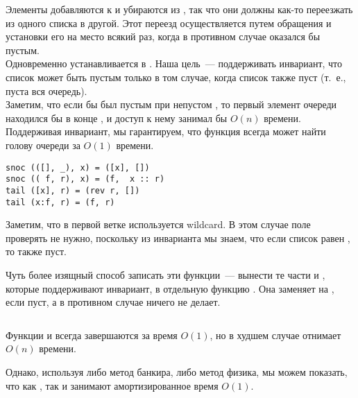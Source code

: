 \documentclass[aspectratio=169
  , xcolor={svgnames}
  , hyperref={ colorlinks,citecolor=DeepPink4
             , linkcolor=DarkRed,urlcolor=DarkBlue}
  , russian
  ]{beamer}
\theoremstyle{exerciseStyle1}
\begin{document}
\begin{frame}[fragile]{}
Элементы добавляются к  и убираются из , так
что они должны как-то переезжать из одного списка в другой. Этот
переезд осуществляется путем обращения  и установки его
на место  всякий раз, когда в противном случае
 оказался бы пустым.\\

 Одновременно 
устанавливается в \hsinline{[]}. Наша цель~--- поддерживать
инвариант, что список  может быть пустым только в том
случае, когда список  также пуст (т.~е., пуста вся
очередь). \\

Заметим, что если бы  был пустым при непустом
, то первый элемент очереди находился бы в конце
, и доступ к нему занимал бы $O(n)$ времени. Поддерживая
инвариант, мы гарантируем, что функция  всегда может
найти голову очереди за $O(1)$ времени.

\end{frame}


\begin{frame}[fragile]{}
\begin{verbatim}
snoc (([], _), x) = ([x], [])
snoc (( f, r), x) = (f,  x :: r)
tail ([x], r) = (rev r, [])
tail (x:f, r) = (f, r)
\end{verbatim}

Заметим, что в первой ветке  используется
wildcard. В этом случае поле  проверять не нужно,
поскольку из инварианта мы знаем, что если список  равен
\hsinline{[]}, то  также пуст.

\end{frame}


\begin{frame}[fragile]{}
Чуть более изящный способ записать эти функции~--- вынести те части
 и , которые поддерживают инвариант, в
отдельную функцию . Она заменяет  на
, если  пуст, а в противном случае
ничего не делает.

\inputminted[firstline=10,lastline=15] {haskell}{code/NaiveQueue.hs}

Функции
 и  всегда завершаются за время
$O(1)$, но  в худшем случае отнимает $O(n)$
времени. 

Однако, используя либо метод банкира, либо метод физика, мы
можем показать, что как , так и 
занимают амортизированное время $O(1)$.

\end{frame}
\end{document}
